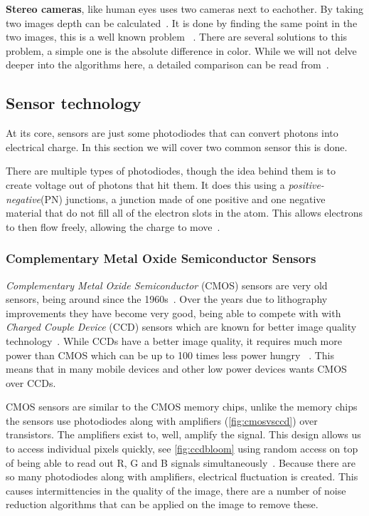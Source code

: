 \textbf{Stereo cameras}, like human eyes uses two cameras next to eachother.
By taking two images depth can be calculated~\cite{adi2017distance}. It is done
by finding the same point in the two images, this is a well known problem~
\cite{scharstein2002taxonomy}. There are several solutions to this problem,
a simple one is the absolute difference in color. While we will not delve
deeper into the algorithms here, a detailed comparison can be read from~\cite{scharstein2002taxonomy}.

\subsection{Sensor technology}\label{section:sensortechnology}
At its core, sensors are just some photodiodes that can convert photons
into electrical charge. In this section we will cover two common sensor this is
done.

There are multiple types of photodiodes, though the idea behind them is to
create voltage out of photons that hit them. It does this using a
\textit{positive-negative}(PN) junctions, a junction made of one positive and
one negative material that do not fill all of the electron slots in the atom.
This allows electrons to then flow freely, allowing the charge to
move~\cite{peterson2001works}.

\subsubsection{Complementary Metal Oxide Semiconductor Sensors}
\textit{Complementary Metal Oxide Semiconductor} (CMOS) sensors are very old
sensors, being around since the 1960s~\cite{ieeeCMOS}. Over the years due to
lithography improvements they have become very good, being able to compete with
with \textit{Charged Couple Device} (CCD) sensors which are known for better
image quality technology~\cite{ieeeCMOS}. While CCDs have a better image quality, it requires
much more power than CMOS which can be up to 100 times less power hungry~
\cite{CMOSReview}. This means that in many mobile devices and other low power
devices wants CMOS over CCDs.

CMOS sensors are similar to the CMOS memory chips, unlike the memory chips the
sensors use photodiodes along with amplifiers (\cref{fig:cmosvsccd}) over
transistors. The amplifiers exist to, well, amplify the signal. This design
allows us to access individual pixels quickly, see \cref{fig:ccdbloom} using
random access on top of being able to read out R, G and B signals
simultaneously~\cite{cmosAlen}. Because there are so many photodiodes along
with amplifiers, electrical fluctuation is created. This causes intermittencies
in the quality of the image, there are a number of noise reduction algorithms
that can be applied on the image to remove these.


